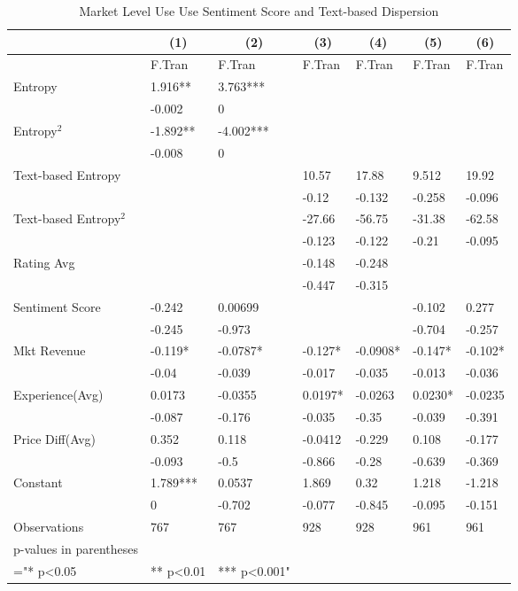 \begin{table}[]
\begin{tabular}{@{}lllllll@{}}
\toprule
\multicolumn{1}{c}{} & \multicolumn{1}{c}{(1)} & \multicolumn{1}{c}{(2)} & \multicolumn{1}{c}{(3)} & \multicolumn{1}{c}{(4)} & \multicolumn{1}{c}{(5)} & \multicolumn{1}{c}{(6)} \\ \midrule
 & F.Tran & F.Tran & F.Tran & F.Tran & F.Tran & F.Tran \\
Entropy & 1.916** & 3.763*** &  &  &  &  \\
 & -0.002 & 0 &  &  &  &  \\
Entropy$^{2}$ & -1.892** & -4.002*** &  &  &  &  \\
 & -0.008 & 0 &  &  &  &  \\
Text-based Entropy &  &  & 10.57 & 17.88 & 9.512 & 19.92 \\
 &  &  & -0.12 & -0.132 & -0.258 & -0.096 \\
Text-based Entropy$^2$ &  &  & -27.66 & -56.75 & -31.38 & -62.58 \\
 &  &  & -0.123 & -0.122 & -0.21 & -0.095 \\
Rating Avg &  &  & -0.148 & -0.248 &  &  \\
 &  &  & -0.447 & -0.315 &  &  \\
Sentiment Score & -0.242 & 0.00699 &  &  & -0.102 & 0.277 \\
 & -0.245 & -0.973 &  &  & -0.704 & -0.257 \\
Mkt Revenue & -0.119* & -0.0787* & -0.127* & -0.0908* & -0.147* & -0.102* \\
 & -0.04 & -0.039 & -0.017 & -0.035 & -0.013 & -0.036 \\
Experience(Avg) & 0.0173 & -0.0355 & 0.0197* & -0.0263 & 0.0230* & -0.0235 \\
 & -0.087 & -0.176 & -0.035 & -0.35 & -0.039 & -0.391 \\
Price Diff(Avg) & 0.352 & 0.118 & -0.0412 & -0.229 & 0.108 & -0.177 \\
 & -0.093 & -0.5 & -0.866 & -0.28 & -0.639 & -0.369 \\
Constant & 1.789*** & 0.0537 & 1.869 & 0.32 & 1.218 & -1.218 \\
 & 0 & -0.702 & -0.077 & -0.845 & -0.095 & -0.151 \\
Observations & 767 & 767 & 928 & 928 & 961 & 961 \\
p-values in parentheses &  &  &  &  &  &  \\
="* p\textless{}0.05 & ** p\textless{}0.01 & *** p\textless{}0.001" &  &  &  &  \\ \bottomrule
\end{tabular}
\caption{Market Level Use Use Sentiment Score and Text-based Dispersion}
\label{reg_mkt_2}
\end{table}